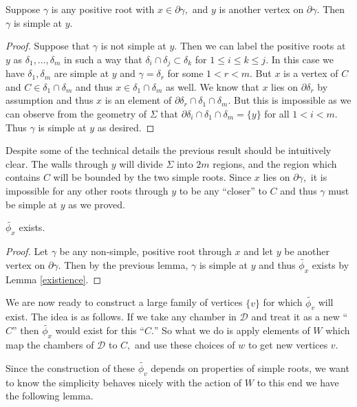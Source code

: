 \documentclass[class=book, crop=false,12 pt]{standalone}
\begin{document}
\begin{lemma}
	Suppose $\gamma$ is any positive root with $x\in \partial \gamma,$ and $y$ is another vertex on $\partial \gamma.$ Then $\gamma$ is simple at $y.$ \label{positiveeverywhereelse}
\end{lemma}
\begin{proof} 
	Suppose that $\gamma$ is not simple at $y.$ Then we can label the positive roots at $y$ as $\delta_1,\dots,\delta_m$ in such a way that $\delta_i\cap \delta_j\subset \delta_k$ for $1\le i\le k\le j.$ In this case we have $\delta_1,\delta_m$ are simple at $y$ and $\gamma=\delta_r$ for some $1<r<m.$ But $x$ is a vertex of $C$ and $C\in \delta_1\cap \delta_m$ and thus $x\in \delta_1\cap \delta_m$ as well. We know that $x$ lies on $\partial \delta_r$ by assumption and thus $x$ is an element of $\partial \delta_r \cap \delta_1\cap \delta_m.$ But this is impossible as we can observe from the geometry of $\Sigma$ that $\partial \delta_i\cap \delta_1\cap \delta_m=\{y\}$ for all $1<i<m.$ Thus $\gamma$ is simple at $y$ as desired.
\end{proof}
Despite some of the technical details the previous result should be intuitively clear. The walls through $y$ will divide $\Sigma$ into $2m$ regions, and the region which contains $C$ will be bounded by the two simple roots. Since $x$ lies on $\partial \gamma,$ it is impossible for any other roots through $y$ to be any ``closer'' to $C$ and thus $\gamma$ must be simple at $y$ as we proved.
\begin{cor}
	$\tilde{\phi_x}$ exists.
\end{cor}
\begin{proof}
	Let $\gamma$ be any non-simple, positive root through $x$ and let $y$ be another vertex on $\partial \gamma.$ Then by the previous lemma, $\gamma$ is simple at $y$ and thus $\tilde{\phi_x}$ exists by Lemma \ref{existience}.
\end{proof}

We are now ready to construct a large family of vertices $\{v\}$ for which $\tilde{\phi_v}$ will exist. The idea is as follows. If we take any chamber in $\mathcal{D}$ and treat it as a new ``$C$'' then $\tilde{\phi_x}$ would exist for this ``$C.$'' So what we do is apply elements of $W$ which map the chambers of $\mathcal{D}$ to $C,$ and use these choices of $w$ to get new vertices $v.$

Since the construction of these $\tilde{\phi_v}$ depends on properties of simple roots, we want to know the simplicity behaves nicely with the action of $W$ to this end we have the following lemma.
\end{document}
